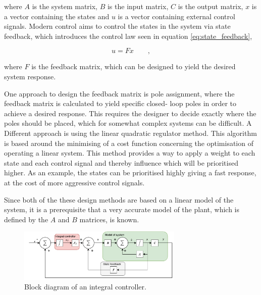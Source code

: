 \documentclass[../../main.tex]{subfiles}
\begin{document}
where $A$ is the system matrix, $B$ is the input matrix, $C$ is the output matrix,  $x$ is a vector containing the states and $u$ is a vector containing external control signals.
Modern control aims to control the states in the system via state feedback, which introduces the control law seen in equation \ref{eq:state_feedback},

\begin{equation}\label{eq:state_feedback}
    u = F x \qquad ,
\end{equation}

where $F$ is the feedback matrix, which can be designed to yield the desired system response.





One approach to design the feedback matrix is pole assignment, where the feedback matrix is calculated to yield specific closed- loop poles in order to achieve a desired response. This requires the designer to decide exactly where the poles should be placed, which for somewhat complex systems can be difficult.
A Different approach is using the linear quadratic regulator method. This algorithm is based around the minimising of a cost function concerning the optimisation of operating a linear system. This method provides a way to apply a weight to each state and each control signal and thereby influence which will be prioritised higher. As an example, the states can be prioritised highly giving a fast response, at the cost of more aggressive control signals.

Since both of the these design methods are based on a linear model of the system, it is a prerequisite that a very accurate model of the plant, which is defined by the $A$ and $B$ matrices, is known. 

\begin{figure}
    \centering
    \includegraphics[width=0.7\textwidth]{Sections/Miscellaneous/Images/Statefeedback_Integral.pdf}
    \caption{Block diagram of an integral controller.}
    \label{fig:Integral_Diagram}
\end{figure}
\end{document}
